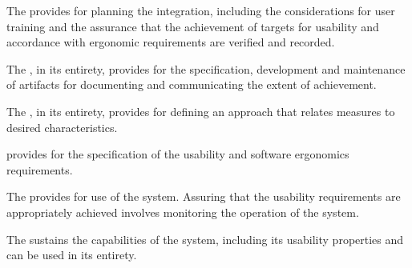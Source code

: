 \begin{adjustwidth}{2em}{0pt}
\begin{compactenum}
				\item The  provides for planning the integration, including the considerations for user training and the assurance that the achievement of targets for usability and accordance with ergonomic requirements are verified and recorded.

				\item The , in its entirety, provides for the specification, development and maintenance of artifacts for documenting and communicating the extent of achievement. 

				\item The , in its entirety, provides for defining an approach that relates measures to desired characteristics. 

				\item {} provides for the specification of the usability and software ergonomics requirements.

				\item The  provides for use of the system. Assuring that the usability requirements are appropriately achieved involves monitoring the operation of the system. 

				\item The  sustains the capabilities of the system, including its usability properties and can be used in its entirety.

			\end{compactenum}

		\end{adjustwidth}